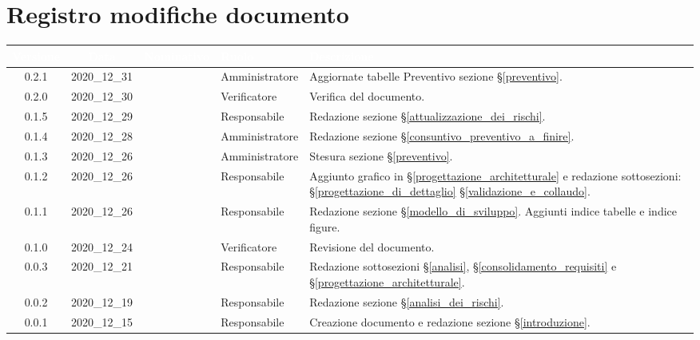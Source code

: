 \section*{Registro modifiche documento}
{

     
\renewcommand{\arraystretch}{1.5}
\centering
\begin{longtable}{ c c  C{3cm} C{3cm} C{5cm}}


 \textcolor{white}{\textbf{Versione}}&
    \textcolor{white}{\textbf{Data}}&
    \textcolor{white}{\textbf{Nominativo}}&
    \textcolor{white}{\textbf{Ruolo}}&
    \textcolor{white}{\textbf{Descrizione}}\\	
    \endhead

	0.2.1 & 2020\_12\_31 & \TG{} & Amministratore & Aggiornate tabelle Preventivo sezione \S\ref{preventivo}.\\

	0.2.0 & 2020\_12\_30 & \TG{} & Verificatore & Verifica del documento.\\

    0.1.5 & 2020\_12\_29 & \MM{} & Responsabile & Redazione sezione \S\ref{attualizzazione_dei_rischi}. \\

    0.1.4 & 2020\_12\_28 & \PC{} & Amministratore & Redazione sezione \S\ref{consuntivo_preventivo_a_finire}. \\

    0.1.3 & 2020\_12\_26 & \PC{} & Amministratore & Stesura sezione \S\ref{preventivo}. \\

    0.1.2 & 2020\_12\_26 & \MM{} & Responsabile & Aggiunto grafico in \S\ref{progettazione_architetturale} e redazione sottosezioni:  \S\ref{progettazione_di_dettaglio} \S\ref{validazione_e_collaudo}. \\

    0.1.1 & 2020\_12\_26 & \MM{} & Responsabile & Redazione sezione \S\ref{modello_di_sviluppo}. Aggiunti indice tabelle e indice figure. \\

    0.1.0 & 2020\_12\_24 & \PC{} & Verificatore & Revisione del documento.\\

    0.0.3 & 2020\_12\_21 & \MM{} & Responsabile & Redazione sottosezioni \S\ref{analisi}, \S\ref{consolidamento_requisiti} e \S\ref{progettazione_architetturale}. \\

    0.0.2 & 2020\_12\_19 & \MM{} & Responsabile & Redazione sezione \S\ref{analisi_dei_rischi}.\\

    0.0.1 & 2020\_12\_15 & \MM{} & Responsabile & Creazione documento e redazione sezione \S\ref{introduzione}.
			
\end{longtable}
}